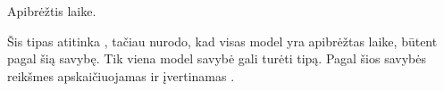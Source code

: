 \documentclass[letterpaper,10pt,lithuanian]{sphinxmanual}
\begin{document}
\begin{fulllineitems}

\pysigstartsignatures
{}
\pysigstopsignatures
\sphinxAtStartPar
{}

\sphinxAtStartPar
Apibrėžtis laike.

\sphinxAtStartPar
Šis tipas atitinka , tačiau nurodo, kad visas model yra
apibrėžtas laike, būtent pagal šią savybę. Tik viena model savybė gali
turėti  tipą. Pagal šios savybės reikšmes apskaičiuojamas ir
įvertinamas .

\end{fulllineitems}

\end{document}

